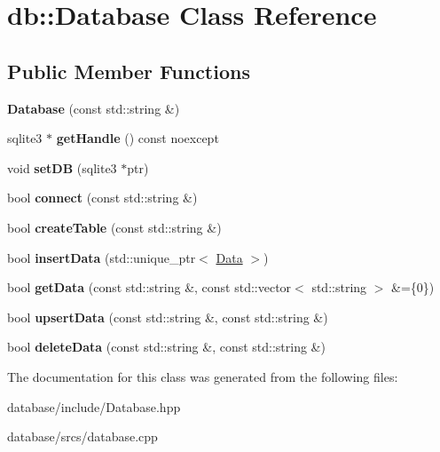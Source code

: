 \hypertarget{classdb_1_1_database}{}\section{db\+:\+:Database Class Reference}
\label{classdb_1_1_database}
\subsection*{Public Member Functions}
\begin{DoxyCompactItemize}
\item 
\mbox{\label{classdb_1_1_database_a5200addea0e3fc460ef27bc2844c46d4}} 
{\bfseries Database} (const std\+::string \&)
\item 
\mbox{\label{classdb_1_1_database_a910e5c167e9a09fe82502a6deb873cce}} 
sqlite3 $\ast$ {\bfseries get\+Handle} () const noexcept
\item 
\mbox{\label{classdb_1_1_database_a36c7f9800efa1339aec390034159504a}} 
void {\bfseries set\+DB} (sqlite3 $\ast$ptr)
\item 
\mbox{\label{classdb_1_1_database_ab7a2977a4868371b89f71a5cf416af40}} 
bool {\bfseries connect} (const std\+::string \&)
\item 
\mbox{\label{classdb_1_1_database_adbc0fb846b70c90943444291108a83e1}} 
bool {\bfseries create\+Table} (const std\+::string \&)
\item 
\mbox{\label{classdb_1_1_database_a3a79798d2a578637e7766d07851e5969}} 
bool {\bfseries insert\+Data} (std\+::unique\+\_\+ptr$<$ \hyperlink{classdb_1_1_data}{Data} $>$)
\item 
\mbox{\label{classdb_1_1_database_aacd31fe3f503a0952c19f97844bcf39b}} 
bool {\bfseries get\+Data} (const std\+::string \&, const std\+::vector$<$ std\+::string $>$ \&=\{0\})
\item 
\mbox{\label{classdb_1_1_database_af39290b0a332e70a58730a2a203971a2}} 
bool {\bfseries upsert\+Data} (const std\+::string \&, const std\+::string \&)
\item 
\mbox{\label{classdb_1_1_database_ad224379ea6968245a23fcf1e92db8ab6}} 
bool {\bfseries delete\+Data} (const std\+::string \&, const std\+::string \&)
\end{DoxyCompactItemize}


The documentation for this class was generated from the following files\+:\begin{DoxyCompactItemize}
\item 
database/include/Database.\+hpp\item 
database/srcs/database.\+cpp\end{DoxyCompactItemize}
